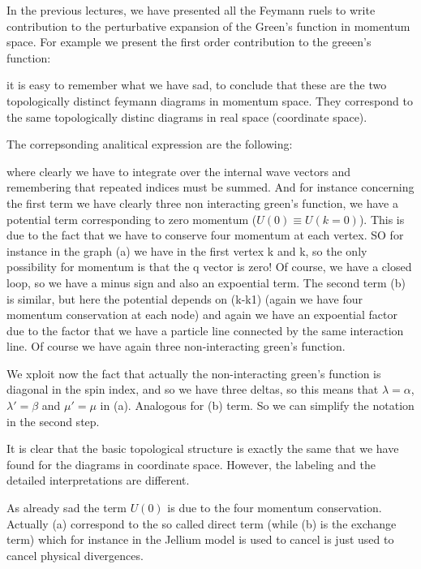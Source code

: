 \documentclass[../main/main.tex]{subfiles}
\begin{document}

In the previous lectures, we have presented all the Feymann ruels to write contribution to the perturbative expansion of the Green's function in momentum space.
For example we present the first order contribution to the greeen's function:

it is easy to remember what we have sad, to conclude that these are the two topologically distinct feymann diagrams in momentum space. They correspond to the same topologically distinc diagrams in real space (coordinate space).

The correpsonding analitical expression are the following:

where clearly we have to integrate over the internal wave vectors and remembering that repeated indices must be summed. And for instance concerning the first term we have clearly three non interacting green's function, we have a potential term corresponding to zero momentum (\( U(0) \equiv U (k=0) \)). This is due to the fact that we have to conserve four momentum at each vertex. SO for instance in the graph (a) we have in the first vertex k and k, so the only possibility for momentum is that the q vector is zero!
Of course, we have a closed loop, so we have a minus sign and also an expoential term.
The second term (b) is similar, but here the potential depends on (k-k1) (again we have four momentum conservation at each node) and again we have an expoential factor due to the factor that we have a particle line connected by the same  interaction line. Of course we have again three non-interacting green's function.

We xploit now the fact that actually the non-interacting green's function is diagonal in the spin index, and so we have three deltas, so this means that \(  \lambda=\alpha   \), \(  \lambda' = \beta \) and \( \mu' = \mu  \) in (a). Analogous for  (b) term.
So we can simplify the notation in the second step.


It is clear that the basic topological structure is exactly the same that we have found for the diagrams in coordinate space. However, the labeling and the detailed interpretations are different.

As already sad the term \( U(0) \) is due to the four momentum conservation. Actually (a) correspond to the so called direct term (while (b) is the exchange term) which for instance in the Jellium model is used to cancel is just used to cancel physical divergences.
\end{document}
